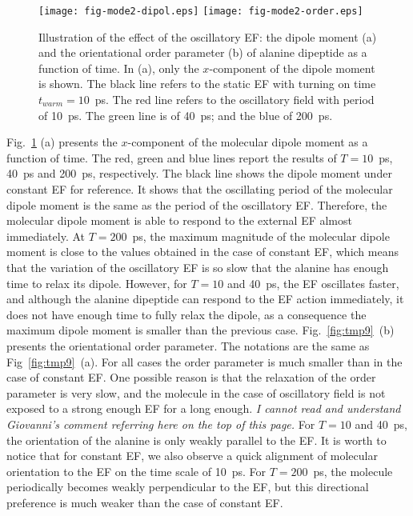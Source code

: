 \documentclass[a4paper,preprint,unsortedaddress,onecolumn]{revtex4-1}
\newcommand{\recheck}[1]{{\color{red} #1}}
\newcommand{\bluec}[1]{{\color{blue} #1}}
\begin{document}
\begin{figure}
  \centering
  \texttt{[image: fig-mode2-dipol.eps]}
  \texttt{[image: fig-mode2-order.eps]}
  \caption{Illustration of the effect of the oscillatory EF:
    the dipole moment (a) and the
    orientational order parameter (b) of alanine dipeptide as a
    function of time. In (a),
    only the $x$-component of the dipole moment is
    shown. The black line refers to the static EF with turning on
    time $t_{warm} = 10$~ps. The red line refers to the oscillatory field with period of
    10~ps. The green line is of 40~ps; and the blue of 200~ps.}
  \label{fig:tmp8}
\end{figure}


Fig.~\ref{fig:tmp8} (a)
presents the $x$-component of the molecular dipole moment as
a function of time. The red, green and blue lines report the
results of $T=10$~ps, 40~ps and 200~ps, respectively. The black line
shows the dipole moment under constant EF
for reference.
It shows that the oscillating period of the molecular dipole moment
is the same as the period of the oscillatory EF. Therefore,
the molecular dipole moment
is able to respond to the external EF almost immediately.
At $T=200$~ps, the maximum magnitude of the molecular
dipole moment is close to the values obtained in the case of constant EF, which
means that the variation of the oscillatory EF is so slow that the
alanine has enough time to 
relax its dipole. However,
for $T=10$ and 40~ps, the EF oscillates faster,
and although the alanine dipeptide can respond to the EF action immediately,
it does not have enough time to fully relax the dipole, as a consequence the maximum dipole moment is smaller than the previous case.
Fig.~\ref{fig:tmp9}~(b) presents the orientational order
parameter. The notations are the same as Fig~\ref{fig:tmp9}~(a).
For all cases the order parameter is much
smaller than in the case of constant EF. One possible reason is that the
relaxation of the order parameter is very slow, and the molecule in the case of oscillatory field is
not exposed to a strong enough EF for a long enough.
\bluec{\textit{I cannot read and understand Giovanni's comment referring here on the top of this page.}}
For  $T=10$ and 40~ps, the orientation of the alanine is only weakly
parallel to the EF. It is worth to notice that for constant EF,
we also observe a quick alignment of molecular orientation to the EF
on the time scale of 10~ps. For $T=200$~ps, the molecule periodically
becomes \recheck{weakly} perpendicular to the EF, but this directional preference is much
weaker than the case of constant EF.
\end{document}
